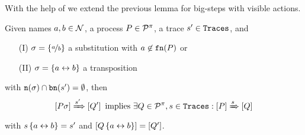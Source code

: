 With the help of  we extend the previous lemma for big-steps with visible actions.

\begin{lemma}
\label{lem_subst_bigstep_partIV}
Given names $a,b\in\mathcal N$, a process $P\in\mathcal P^{\pi}$, a trace $s'\in\mathtt{Traces}$, and 
\begin{itemize}
\item[(I)] $\sigma=\left\{\nicefrac{a}{b}\right\}$ a substitution with $a\not\in\mathtt{fn}(P)$ or
\item[(II)] $\sigma=\left\{a\leftrightarrow{}b\right\}$ a transposition
\end{itemize}
with $\mathtt{n}(\sigma)\cap\mathtt{bn}(s')=\emptyset$, then 
\[\left[P\sigma\right]\xRightarrow{s'}\left[Q'\right] \text{ implies } \exists Q\in\mathcal P^{\pi},s\in\mathtt{Traces}:\left[P\right]\xRightarrow{s}\left[Q\right]\]
with $s\left\{a\leftrightarrow{}b\right\}=s'$ and $\left[Q\left\{a\leftrightarrow{}b\right\}\right]=\left[Q'\right]$.
\end{lemma}
